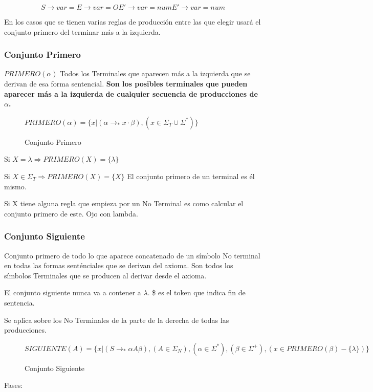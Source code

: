 \documentclass[12pt, twoside, openright]{report} %
\begin{document}
$$S \rightarrow var = E \rightarrow var = O E'\rightarrow var = num E' \rightarrow var = num$$


En los casos que se tienen varias reglas de producción entre las que
elegir usará el conjunto primero del terminar más a la izquierda.


\subsubsection{Conjunto Primero}

\(PRIMERO(\alpha)\) Todos los Terminales que aparecen más a la izquierda
que se derivan de esa forma sentencial. \textbf{Son los posibles
terminales que pueden aparecer más a la izquierda de cualquier secuencia
de producciones de \(\alpha\).} 
\begin{figure}[H]
  $PRIMERO(\alpha)=\{ x | (\alpha \rightarrow _* x \cdot \beta), (x \in \Sigma_T \cup \Sigma^*)\}$

  \captionsetup{justification=centering}
  \caption{Conjunto Primero}
\end{figure}
Si \(X=\lambda \Rightarrow PRIMERO(X)=\{\lambda\}\)

Si \(X \in \Sigma_T \Rightarrow PRIMERO(X)=\{X\}\) El conjunto primero
de un terminal es él mismo.

Si X tiene alguna regla que empieza por un No Terminal es como calcular
el conjunto primero de este. Ojo con lambda.


\subsubsection{Conjunto Siguiente}

Conjunto primero de todo lo que aparece concatenado de un símbolo No
terminal en todas las formas senténciales que se derivan del axioma. Son
todos los símbolos Terminales que se producen al derivar desde el
axioma.

El conjunto siguiente nunca va a contener a \(\lambda\). \$ es el token
que indica fin de sentencia.

Se aplica sobre los No Terminales de la parte de la derecha de todas las
producciones. 
\begin{figure}[H]
  $SIGUIENTE(A)=\{ x | (S \rightarrow _*\alpha A \beta), (A \in \Sigma_N), (\alpha \in \Sigma^*), (\beta \in \Sigma^+),(x\in PRIMERO(\beta)-\{\lambda\})\}$

  \captionsetup{justification=centering}
  \caption{Conjunto Siguiente}
\end{figure}
Fases:
\end{document}
